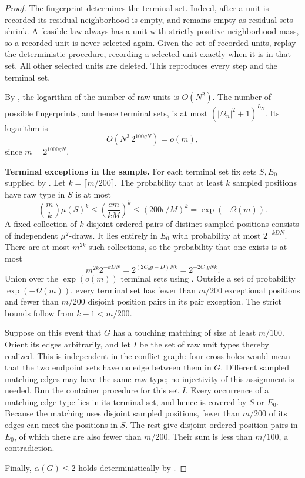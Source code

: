 \begin{proof}
The fingerprint determines the terminal set.
Indeed, after a unit is recorded its residual neighborhood is empty, and remains empty as residual sets shrink.
A feasible law always has a unit with strictly positive neighborhood mass, so a recorded unit is never selected again.
Given the set of recorded units, replay the deterministic procedure, recording a selected unit exactly when it is in that set.
All other selected units are deleted.
This reproduces every step and the terminal set.

By , the logarithm of the number of raw units is \(O(N^2)\).
The number of possible fingerprints, and hence terminal sets, is at most
\((|\Omega_n|^2+1)^{L_N}\).
Its logarithm is
\begin{equation}\label{eq:container-count}
 O(N^3\,2^{100gN})=o(m),
\end{equation}
since \(m=2^{1000gN}\).

\medskip\noindent\textbf{Terminal exceptions in the sample.}
For each terminal set fix sets \(S,E_0\) supplied by .
Let \(k=\lceil m/200\rceil\).
The probability that at least \(k\) sampled positions have raw type in \(S\) is at most
\[
 \binom mk\mu(S)^k
 \le \left(\frac{em}{kM}\right)^k
 \le (200e/M)^k
 =\exp(-\Omega(m)).
\]
A fixed collection of \(k\) disjoint ordered pairs of distinct sampled positions consists of independent \(\mu^2\)-draws.
It lies entirely in \(E_0\) with probability at most \(2^{-kDN}\).
There are at most \(m^{2k}\) such collections, so the probability that one exists is at most
\begin{equation}\label{eq:pair-exception-bound}
 m^{2k}2^{-kDN}
 =2^{(2C_0g-D)Nk}
 =2^{-2C_0gNk}.
\end{equation}
Union over the \(\exp(o(m))\) terminal sets using .
Outside a set of probability \(\exp(-\Omega(m))\), every terminal set has fewer than \(m/200\) exceptional positions and fewer than \(m/200\) disjoint position pairs in its pair exception.
The strict bounds follow from \(k-1<m/200\).

Suppose on this event that \(G\) has a touching matching of size at least \(m/100\).
Orient its edges arbitrarily, and let \(I\) be the set of raw unit types thereby realized.
This is independent in the conflict graph: four cross holes would mean that the two endpoint sets have no edge between them in \(G\).
Different sampled matching edges may have the same raw type; no injectivity of this assignment is needed.
Run the container procedure for this set \(I\).
Every occurrence of a matching-edge type lies in its terminal set, and hence is covered by \(S\) or \(E_0\).
Because the matching uses disjoint sampled positions, fewer than \(m/200\) of its edges can meet the positions in \(S\).
The rest give disjoint ordered position pairs in \(E_0\), of which there are also fewer than \(m/200\).
Their sum is less than \(m/100\), a contradiction.

Finally, \(\alpha(G)\le2\) holds deterministically by .
\end{proof}


